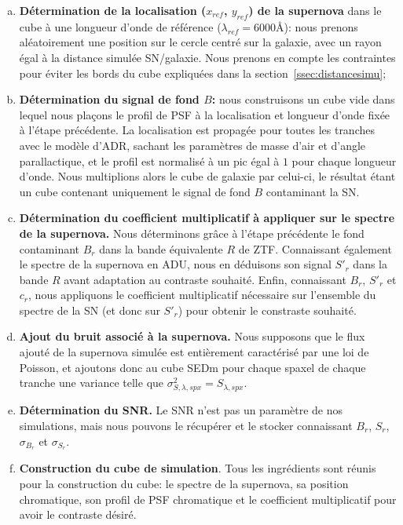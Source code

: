 \documentclass[../main/main.tex]{subfiles}
\begin{document}
\begin{minipage}{\textwidth}%
  \begin{enumerate}[(a)]
    \itemsep=0em
    \item \textbf{Détermination de la localisation ($x_{ref}$, $y_{ref}$) de la supernova} dans le cube
      à une longueur d'onde de référence ($\lambda_{ref}=6000$\AA):
      nous prenons aléatoirement une position sur le cercle centré sur
      la galaxie, avec un rayon égal à la distance simulée
      SN/galaxie. Nous prenons en compte les contraintes pour éviter les
      bords du cube expliquées dans la section~\ref{ssec:distancesimu};
      
  \item \textbf{Détermination du signal de fond $B$:} nous construisons un cube vide dans
    lequel nous plaçons le profil de PSF à la localisation et longueur
    d'onde fixée à l'étape
    précédente. La localisation est propagée pour toutes les tranches
    avec le modèle d'ADR, sachant les paramètres de masse d'air et
    d'angle parallactique, et le profil est normalisé à un pic égal à $1$ pour chaque
    longueur d'onde. Nous multiplions alors le cube de galaxie par
    celui-ci, le résultat étant un cube contenant uniquement le signal de fond $B$
    contaminant la SN.

  \item \textbf{Détermination du coefficient multiplicatif à appliquer sur le
    spectre de la supernova.} Nous déterminons grâce à l'étape précédente le fond contaminant $B_{r}$
    dans la bande équivalente $R$ de ZTF. Connaissant également le spectre de la
    supernova en ADU, nous en déduisons son signal $S'_{r}$ dans
    la bande $R$ avant adaptation au
    contraste souhaité. Enfin, connaissant $B_{r}$, $S'_{r}$ et $c_{r}$, nous
    appliquons le
    coefficient multiplicatif nécessaire sur l'ensemble du spectre de la
    SN (et donc sur $S'_{r}$) pour obtenir le constraste souhaité.

   \item \textbf{Ajout du bruit associé à la supernova.} Nous supposons que le
     flux ajouté de la supernova simulée est entièrement caractérisé
     par une loi de Poisson, et ajoutons donc au cube SEDm pour chaque
     spaxel de chaque tranche une variance telle que $\sigma_{S,\lambda,spx}^{2}=S_{\lambda,spx}$.

   \item \textbf{Détermination du SNR.} Le SNR n'est pas un paramètre de
     nos simulations, mais nous pouvons le récupérer et le stocker connaissant
     $B_{r}$, $S_{r}$, $\sigma_{B_{r}}$ et  $\sigma_{S_{r}}$.

   \item \textbf{Construction du cube de simulation}. Tous les
     ingrédients sont réunis pour la construction du cube: le spectre de
     la supernova, sa position chromatique, son profil de PSF
     chromatique et le coefficient multiplicatif pour avoir le contraste désiré.
  \end{enumerate}
\end{minipage}\\
\end{document}
